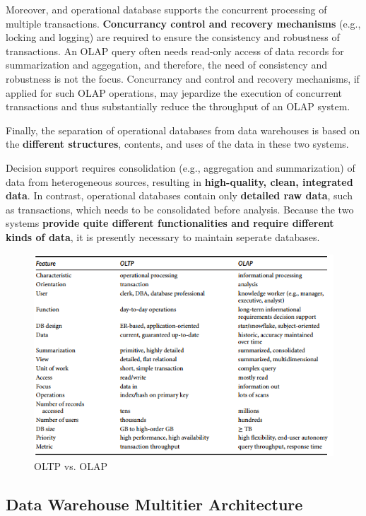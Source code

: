 		Moreover, and operational database supports the concurrent processing of multiple
		transactions. {\bf Concurrancy control and recovery mechanisms} (e.g., locking and logging)
		are required to ensure the consistency and robustness of transactions. An OLAP
		query often needs read-only access of data records for summarization and aggegation,
		and therefore, the need of consistency and robustness is not the focus.
		Concurrancy and control and recovery mechanisms, if applied for such OLAP operations, 
		may jepardize the execution of concurrent transactions and thus substantially
		reduce the throughput of an OLAP system. 

		Finally, the separation of operational databases from data warehouses is based
		on the {\bf different structures}, contents, and uses of the data in these two systems. 

		Decision support requires consolidation (e.g., aggregation and summarization) of data
		from heterogeneous sources, resulting in {\bf high-quality, clean, integrated data}. In 
		contrast, operational databases contain only {\bf detailed raw data}, such as transactions, 
		which needs to be consolidated before analysis. 
		Because the two systems {\bf provide quite different functionalities and require different
		kinds of data}, it is presently necessary to maintain seperate databases. 

		\begin{figure}[H]
			\centering
			\includegraphics[width=\textwidth]{pics/oltpolap.png}
			\caption{OLTP vs. OLAP}
		\end{figure}

	\clearpage
	\subsection{Data Warehouse Multitier Architecture}

